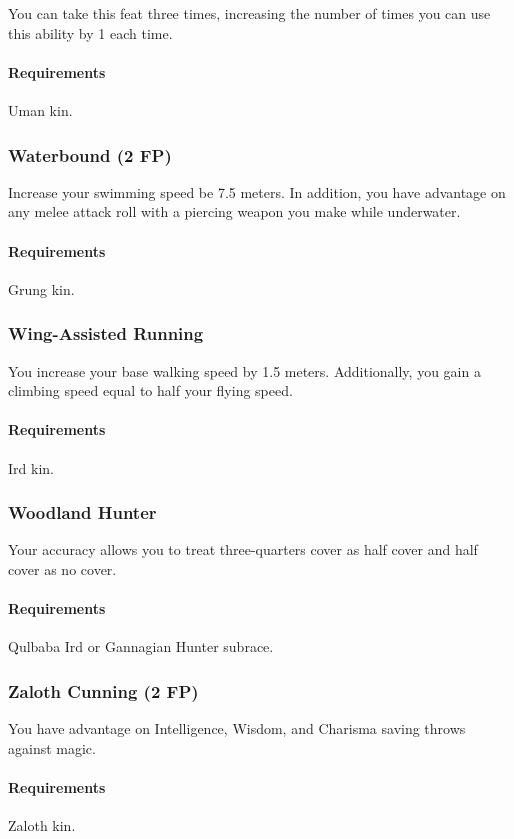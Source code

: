     You can take this feat three times, increasing the number of times you can use this ability by 1 each time.
    \paragraph{Requirements} Uman kin.
\subsubsection{Waterbound (2 FP)} \label{feat::waterbound}
    Increase your swimming speed be 7.5 meters.
    In addition, you have advantage on any melee attack roll with a piercing weapon you make while underwater.
    \paragraph{Requirements} Grung kin.
\subsubsection{Wing-Assisted Running} \label{feat::wingassistedrunning}
    You increase your base walking speed by 1.5 meters.
    Additionally, you gain a climbing speed equal to half your flying speed.
    \paragraph{Requirements} Ird kin.
\subsubsection{Woodland Hunter} \label{feat::woodlandhunter}
    Your accuracy allows you to treat three-quarters cover as half cover and half cover as no cover.
    \paragraph{Requirements} Qulbaba Ird or Gannagian Hunter subrace.
\subsubsection{Zaloth Cunning (2 FP)} \label{feat::zalothcunning}
    You have advantage on Intelligence, Wisdom, and Charisma saving throws against magic.
    \paragraph{Requirements} Zaloth kin.
